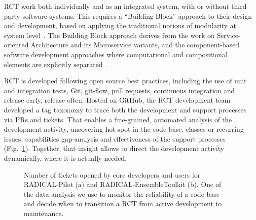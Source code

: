 \documentclass[preprint,12pt, a4paper]{elsarticle}
\begin{document}
RCT work both individually and as an integrated system, with or without third
party software systems. This requires a ``Building Block'' approach to their
design and development, based on applying the traditional notions of modularity
at system level~\cite{turilli2019middleware}. The Building Block approach
derives from the work on Service-oriented Architecture and its Microservice
variants, and the component-based software development approaches where
computational and compositional elements are explicitly
separated~\cite{garlan1995architectural,clemens1998component,schneider2000components}.

RCT is developed following open source best practices, including the use of unit
and integration tests, Git, git-flow, pull requests, continuous integration and
release early, release often. Hosted on GitHub, the RCT development team
developed a tag taxonomy to trace both the development and support processes via
PRs and tickets. That enables a fine-grained, automated analysis of the
development activity, uncovering hot-spot in the code base, classes or recurring
issues, capabilities gap-analysis and effectiveness of the support processes
(Fig.~\ref{fig:tags}). Together, that insight allows to direct the development
activity dynamically, where it is actually needed.
\begin{figure}
        \centering
        \qquad
        \caption{Number of tickets opened by core developers and users for
        RADICAL-Pilot (a) and RADICAL-EnsembleToolkit (b). One of the data
        analysis we use to monitor the reliability of a code base and decide
        when to transition a RCT from active development to
        maintenance.}\label{fig:tags}
\end{figure}
\end{document}
